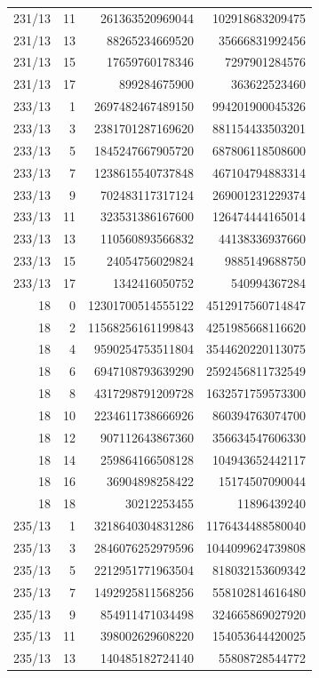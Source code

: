 \begin{longtable}{@{}rrrr@{}}
231/13 & 11 & 261363520969044 & 102918683209475\\
231/13 & 13 & 88265234669520 & 35666831992456\\
231/13 & 15 & 17659760178346 & 7297901284576\\
231/13 & 17 & 899284675900 & 363622523460\\
233/13 & 1 & 2697482467489150 & 994201900045326\\
233/13 & 3 & 2381701287169620 & 881154433503201\\
233/13 & 5 & 1845247667905720 & 687806118508600\\
233/13 & 7 & 1238615540737848 & 467104794883314\\
233/13 & 9 & 702483117317124 & 269001231229374\\
233/13 & 11 & 323531386167600 & 126474444165014\\
233/13 & 13 & 110560893566832 & 44138336937660\\
233/13 & 15 & 24054756029824 & 9885149688750\\
233/13 & 17 & 1342416050752 & 540994367284\\
18 & 0 & 12301700514555122 & 4512917560714847\\
18 & 2 & 11568256161199843 & 4251985668116620\\
18 & 4 & 9590254753511804 & 3544620220113075\\
18 & 6 & 6947108793639290 & 2592456811732549\\
18 & 8 & 4317298791209728 & 1632571759573300\\
18 & 10 & 2234611738666926 & 860394763074700\\
18 & 12 & 907112643867360 & 356634547606330\\
18 & 14 & 259864166508128 & 104943652442117\\
18 & 16 & 36904898258422 & 15174507090044\\
18 & 18 & 30212253455 & 11896439240\\
235/13 & 1 & 3218640304831286 & 1176434488580040\\
235/13 & 3 & 2846076252979596 & 1044099624739808\\
235/13 & 5 & 2212951771963504 & 818032153609342\\
235/13 & 7 & 1492925811568256 & 558102814616480\\
235/13 & 9 & 854911471034498 & 324665869027920\\
235/13 & 11 & 398002629608220 & 154053644420025\\
235/13 & 13 & 140485182724140 & 55808728544772\\

\end{longtable}
